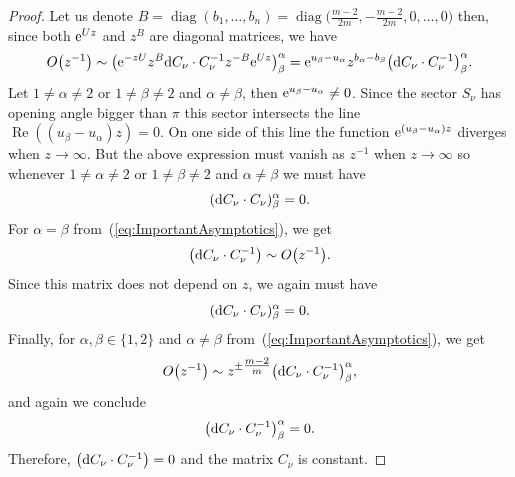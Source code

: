 \documentclass[pdftex]{sigma}
\numberwithin{equation}{section}
\begin{document}
\begin{proof}
 Let us denote $B=\operatorname{diag}(b_{1},\dots,b_{n})=\operatorname{diag}\bigl(\tfrac{m-2}{2m},-\tfrac{m-2}{2m},0,\dots,0\bigr)$ then, since both ${\rm e}^{Uz}$ and $z^{B}$ are diagonal matrices, we have
 \begin{equation}
 \label{eq:ImportantAsymptotics}
 O\bigl(z^{-1}\bigr)\sim\bigl({\rm e}^{-zU}z^{B}{\rm d} C_{\nu}\cdot C_{\nu}^{-1}z^{-B}{\rm e}^{Uz}\bigr)^{\alpha}_{\beta}={\rm e}^{u_{\beta}-u_{\alpha}}z^{b_{\alpha}-b_{\beta}}\bigl({\rm d}C_{\nu}\cdot C_{\nu}^{-1}\bigr)^{\alpha}_{\beta}.
 \end{equation}
 Let $1\neq\alpha\neq 2$ or $1\neq\beta\neq 2$ and $\alpha\neq\beta$, then ${\rm e}^{u_{\beta}-u_{\alpha}}\neq 0$. Since the sector $S_{\nu}$ has opening angle bigger than $\pi$ this sector intersects the line $\operatorname{Re}((u_{\beta}-u_{\alpha})z)=0$. On one side of this line the function ${\rm e}^{(u_{\beta}-u_{\alpha})z}$ diverges when $z\rightarrow\infty$. But the above expression must vanish as $z^{-1}$ when $z\rightarrow\infty$ so whenever $1\neq\alpha\neq 2$ or $1\neq\beta\neq 2$ and $\alpha\neq\beta$ we must have
 \begin{equation*}
 ({\rm d}C_{\nu}\cdot C_{\nu})^{\alpha}_{\beta}=0.
 \end{equation*}
 For $\alpha=\beta$ from~(\ref{eq:ImportantAsymptotics}), we get
 \begin{equation*}
 \bigl({\rm d}C_{\nu}\cdot C_{\nu}^{-1}\bigr)\sim O\bigl(z^{-1}\bigr).
 \end{equation*}
 Since this matrix does not depend on $z$, we again must have
 \begin{equation*}
 ({\rm d}C_{\nu}\cdot C_{\nu})^{\alpha}_{\beta}=0.
 \end{equation*}
 Finally, for $\alpha,\beta\in\{ 1,2 \}$ and $\alpha\neq\beta$ from~(\ref{eq:ImportantAsymptotics}), we get
 \begin{equation*}
 O\bigl(z^{-1}\bigr)\sim z^{\pm\tfrac{m-2}{m}}\bigl({\rm d}C_{\nu}\cdot C_{\nu}^{-1}\bigr)^{\alpha}_{\beta},
 \end{equation*}
 and again we conclude
 \begin{equation*}
 \bigl({\rm d}C_{\nu}\cdot C_{\nu}^{-1}\bigr)^{\alpha}_{\beta}=0.
 \end{equation*}
 Therefore, $\bigl({\rm d}C_{\nu}\cdot C_{\nu}^{-1}\bigr)=0$ and the matrix $C_{\nu}$ is constant.
\end{proof}
\end{document}
